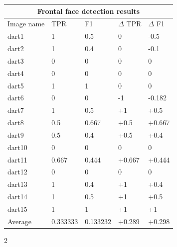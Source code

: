 \documentclass{article}
\begin{document}
\begin{multicols}{2}
{
}

\begin{center}
\begin{tabular}{ |p{1.3cm}||p{1.3cm}|p{1.3cm}|p{1.3cm}|p{1.3cm}| }
 \hline
 \multicolumn{5}{|c|}{Frontal face detection results} \\
 \hline
 Image name & TPR & F1 & \(\Delta\) TPR & \(\Delta\) F1 \\
 \hline
 dart1  & 1  & 0.5 & 0 & -0.5 \\
 dart2  & 1  & 0.4 & 0 & -0.1 \\
 dart3  & 0  & 0 & 0 & 0 \\
 dart4  & 0  & 0 & 0 & 0      \\
 dart5  & 1  & 1 & 0 & 0      \\
 dart6  & 0  & 0 & -1 & -0.182 \\
 dart7  & 1  & 0.5 & +1 & +0.5 \\
 dart8  & 0.5  & 0.667 & +0.5 & +0.667   \\
 dart9  & 0.5  & 0.4 & +0.5 & +0.4           \\
 dart10 & 0  & 0 & 0 & 0          \\
 dart11 & 0.667  & 0.444 & +0.667  & +0.444          \\
 dart12 & 0  & 0 & 0 & 0         \\
 dart13 & 1  & 0.4 & +1 & +0.4         \\
 dart14 & 1  & 0.5 & +1 & +0.5         \\
 dart15 & 1  & 1   & +1 & +1     \\
 \hline
 Average& 0.333333  & 0.133232 & +0.289 & +0.298   \\ 
 \hline
\end{tabular}
\label{tab:vjhoughdartstable}
\end{center}





\end{multicols}{2}



\end{document}
